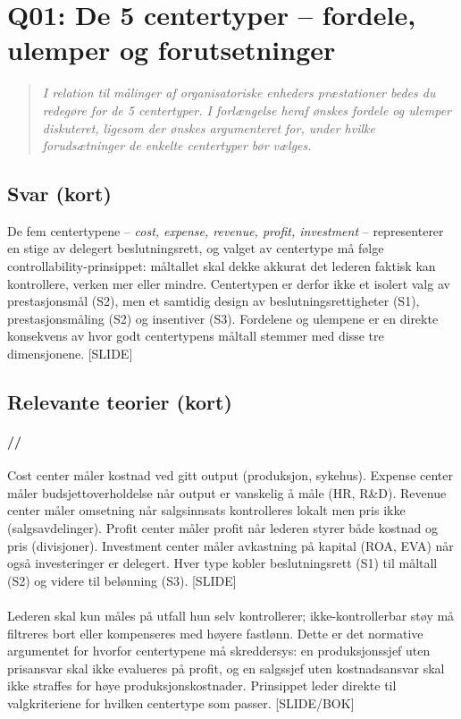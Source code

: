 \section{Q01: De 5 centertyper -- fordele, ulemper og forutsetninger}\label{q:01}

\begin{quote}
\emph{I relation til målinger af organisatoriske enheders præstationer bedes du redegøre for de 5 centertyper. I forlængelse heraf ønskes fordele og ulemper diskuteret, ligesom der ønskes argumenteret for, under hvilke forudsætninger de enkelte centertyper bør vælges.}
\end{quote}

\subsection*{Svar (kort)}
De fem centertypene -- \emph{cost, expense, revenue, profit, investment} -- representerer en stige av delegert beslutningsrett, og valget av centertype må følge controllability-prinsippet: måltallet skal dekke akkurat det lederen faktisk kan kontrollere, verken mer eller mindre. Centertypen er derfor ikke et isolert valg av prestasjonsmål (S2), men et samtidig design av beslutningsrettigheter (S1), prestasjonsmåling (S2) og insentiver (S3). Fordelene og ulempene er en direkte konsekvens av hvor godt centertypens måltall stemmer med disse tre dimensjonene. [SLIDE]

\subsection*{Relevante teorier (kort)}

\paragraph{\quad\SOne/\STwo/\SThree}
Cost center måler kostnad ved gitt output (produksjon, sykehus). Expense center måler budsjettoverholdelse når output er vanskelig å måle (HR, R\&D). Revenue center måler omsetning når salgsinnsats kontrolleres lokalt men pris ikke (salgsavdelinger). Profit center måler profit når lederen styrer både kostnad og pris (divisjoner). Investment center måler avkastning på kapital (ROA, EVA) når også investeringer er delegert. Hver type kobler beslutningsrett (S1) til måltall (S2) og videre til belønning (S3). [SLIDE]

\paragraph{\quad\STwo}
Lederen skal kun måles på utfall hun selv kontrollerer; ikke-kontrollerbar støy må filtreres bort eller kompenseres med høyere fastlønn. Dette er det normative argumentet for hvorfor centertypene må skreddersys: en produksjonssjef uten prisansvar skal ikke evalueres på profit, og en salgssjef uten kostnadsansvar skal ikke straffes for høye produksjonskostnader. Prinsippet leder direkte til valgkriteriene for hvilken centertype som passer. [SLIDE/BOK]

